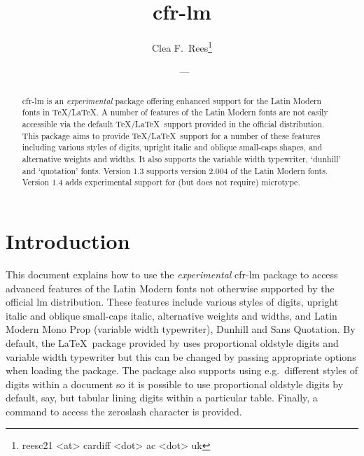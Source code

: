 \documentclass[11pt,british,a4paper]{article}
\title{cfr-lm}
\author{Clea F.\ Rees\footnote{reesc21 <at> cardiff <dot> ac <dot> uk}}
\date{\fyversion\ --- \dyddiad}
\begin{document}
\maketitle\thispagestyle{empty}
\setlength{\parindent}{0pt}
\setlength{\parskip}{0.5em}

\newcommand*{\lpack}[1]{\textsf{#1}}
\newcommand*{\fgroup}[1]{\textsf{#1}}

\begin{abstract}
	\hspace*{-\parindent}\lpack{cfr-lm} is an \emph{experimental} package offering enhanced support for the Latin Modern fonts in \TeX/\LaTeX. A number of features of the Latin Modern fonts are not easily accessible via the default \TeX/\LaTeX\ support provided in the official distribution. This package aims to provide \TeX/\LaTeX\ support for a number of these features including various styles of digits, upright italic and oblique small-caps shapes, and alternative weights and widths. It also supports the variable width typewriter, ‘dunhill’ and ‘quotation’ fonts. Version 1.3 supports version 2.004 of the Latin Modern fonts. Version 1.4 adds experimental support for (but does not require) \lpack{microtype}.
\end{abstract}

\tableofcontents


\section{Introduction}

This document explains how to use the \emph{experimental} \lpack{cfr-lm} package to access advanced features of the Latin Modern fonts not otherwise supported by the official \lpack{lm} distribution. These features include various styles of digits, upright italic and oblique small-caps italic, alternative weights and widths, and Latin Modern Mono Prop (variable width typewriter), Dunhill and Sans Quotation. By default, the \LaTeX\ package provided by  uses proportional oldstyle digits and variable width typewriter but this can be changed by passing appropriate options when loading the package. The package also supports using e.g.\ different styles of digits within a document so it is possible to use proportional oldstyle digits by default, say, but tabular lining digits within a particular table. Finally, a command to access the zeroslash character is provided.
\end{document}
